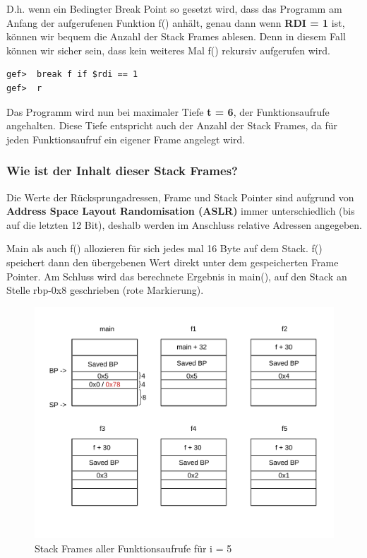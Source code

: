 \documentclass[12pt]{article}
\begin{document}
D.h. wenn ein Bedingter Break Point so gesetzt wird, dass das Programm am Anfang der aufgerufenen Funktion f() anhält, genau dann wenn \textbf{RDI = 1} ist, können wir bequem die Anzahl der Stack Frames ablesen. Denn in diesem Fall können wir sicher sein, dass kein weiteres Mal f() rekursiv aufgerufen wird.

\begin{lstlisting}
gef>  break f if $rdi == 1
gef>  r
\end{lstlisting}

Das Programm wird nun bei maximaler Tiefe \textbf{t = 6}, der Funktionsaufrufe angehalten. Diese Tiefe entspricht auch der Anzahl der Stack Frames, da für jeden Funktionsaufruf ein eigener Frame angelegt wird.


\subsubsection{Wie ist der Inhalt dieser Stack Frames?}
Die Werte der Rücksprungadressen, Frame und Stack Pointer sind aufgrund von \textbf{Address Space Layout Randomisation (ASLR)} immer unterschiedlich (bis auf die letzten 12 Bit), deshalb werden im Anschluss relative Adressen angegeben.

Main als auch f() allozieren für sich jedes mal 16 Byte auf dem Stack. f() speichert dann den übergebenen Wert direkt unter dem gespeicherten Frame Pointer. Am Schluss wird das berechnete Ergebnis in main(), auf den Stack an Stelle rbp-0x8 geschrieben (rote Markierung).

\begin{center}
\begin{figure}[H]
	\includegraphics[scale=0.8, angle=90]{Pictures/a3_stack_frames.pdf}
	\caption{Stack Frames aller Funktionsaufrufe für i = 5}
	\label{fig:recursive3}
\end{figure}
\end{center}
\end{document}
